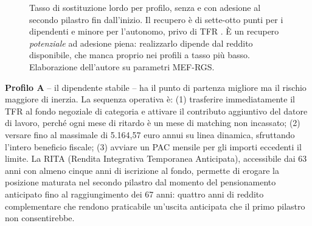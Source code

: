 \begin{figure}[h!]
\centering
{}
\caption{Tasso di sostituzione lordo per profilo, senza e con adesione al secondo
pilastro fin dall'inizio. Il recupero è di sette-otto punti per i dipendenti e
minore per l'autonomo, privo di TFR \cite{MEF_RGS2025}. È un recupero
\emph{potenziale} ad adesione piena: realizzarlo dipende dal reddito disponibile,
che manca proprio nei profili a tasso più basso. Elaborazione dell'autore su
parametri MEF-RGS.}
\label{fig:recupero_ts}
\end{figure}

\medskip
\noindent
\textbf{Profilo A} -- il dipendente stabile -- ha il punto di
partenza migliore ma il rischio maggiore di inerzia. La sequenza
operativa è: (1) trasferire immediatamente il TFR al fondo negoziale
di categoria e attivare il contributo aggiuntivo del datore di
lavoro, perché ogni mese di ritardo è un mese di matching non
incassato; (2) versare fino al massimale di 5.164,57 euro annui
su linea dinamica, sfruttando l'intero beneficio fiscale;
(3) avviare un PAC mensile per gli importi eccedenti il limite.
La RITA (Rendita Integrativa Temporanea Anticipata), accessibile
dai 63 anni con almeno cinque anni di iscrizione al fondo, permette
di erogare la posizione maturata nel secondo pilastro dal momento
del pensionamento anticipato fino al raggiungimento dei 67 anni:
quattro anni di reddito complementare che rendono praticabile
un'uscita anticipata che il primo pilastro non consentirebbe.

